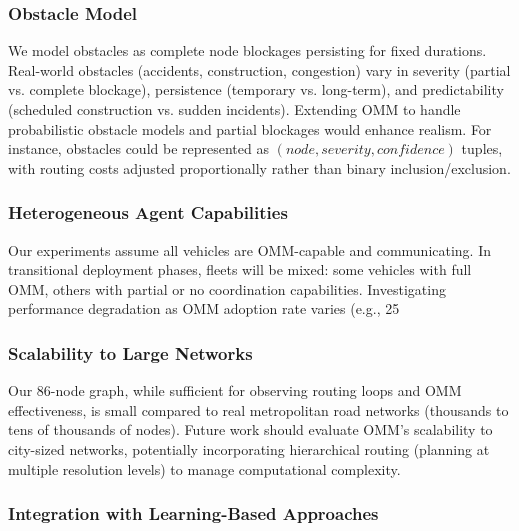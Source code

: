 \documentclass[conference]{IEEEtran}
\begin{document}
\subsubsection{Obstacle Model}

We model obstacles as complete node blockages persisting for fixed durations. Real-world obstacles (accidents, construction, congestion) vary in severity (partial vs. complete blockage), persistence (temporary vs. long-term), and predictability (scheduled construction vs. sudden incidents). Extending OMM to handle probabilistic obstacle models and partial blockages would enhance realism. For instance, obstacles could be represented as $(node, severity, confidence)$ tuples, with routing costs adjusted proportionally rather than binary inclusion/exclusion.

\subsubsection{Heterogeneous Agent Capabilities}

Our experiments assume all vehicles are OMM-capable and communicating. In transitional deployment phases, fleets will be mixed: some vehicles with full OMM, others with partial or no coordination capabilities. Investigating performance degradation as OMM adoption rate varies (e.g., 25%

\subsubsection{Scalability to Large Networks}

Our 86-node graph, while sufficient for observing routing loops and OMM effectiveness, is small compared to real metropolitan road networks (thousands to tens of thousands of nodes). Future work should evaluate OMM's scalability to city-sized networks, potentially incorporating hierarchical routing (planning at multiple resolution levels) to manage computational complexity.

\subsubsection{Integration with Learning-Based Approaches}
\end{document}
